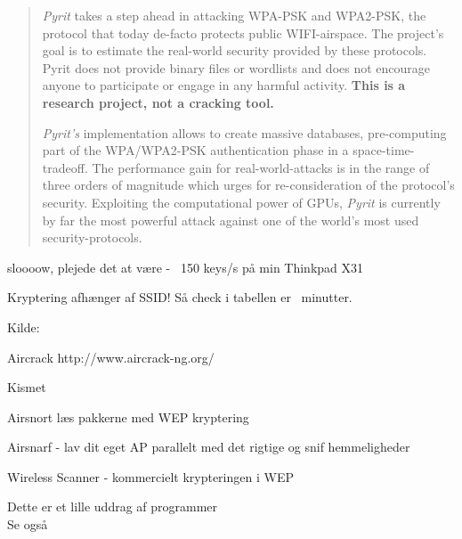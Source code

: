 \documentclass[Screen16to9,17pt]{foils}
\begin{document}
\begin{quote}
\emph{Pyrit} takes a step ahead in attacking WPA-PSK and WPA2-PSK, the protocol that today de-facto protects public WIFI-airspace. The project's goal is to estimate the real-world security provided by these protocols. Pyrit does not provide binary files or wordlists and does not encourage anyone to participate or engage in any harmful activity. {\bf This is a research project, not a cracking tool.}

\emph{Pyrit's} implementation allows to create massive databases, pre-computing part of the WPA/WPA2-PSK authentication phase in a space-time-tradeoff. The performance gain for real-world-attacks is in the range of three orders of magnitude which urges for re-consideration of the protocol's security. Exploiting the computational power of GPUs, \emph{Pyrit} is currently by far the most powerful attack against one of the world's most used security-protocols.
\end{quote}

\begin{list1}
\item sloooow, plejede det at være -  ~150 keys/s på min Thinkpad X31
\item Kryptering afhænger af SSID! Så check i tabellen er ~minutter.
\item {}
\end{list1}



Kilde: 



\begin{list2}
\item Aircrack {http://www.aircrack-ng.org/}
\item Kismet 
\item Airsnort  læs pakkerne med WEP
  kryptering
\item Airsnarf  - lav dit eget AP
  parallelt med det rigtige og snif hemmeligheder
\item Wireless Scanner  - kommercielt
  krypteringen i WEP
\item Dette er et lille uddrag af programmer\\
Se også 
\end{list2}
\end{document}
